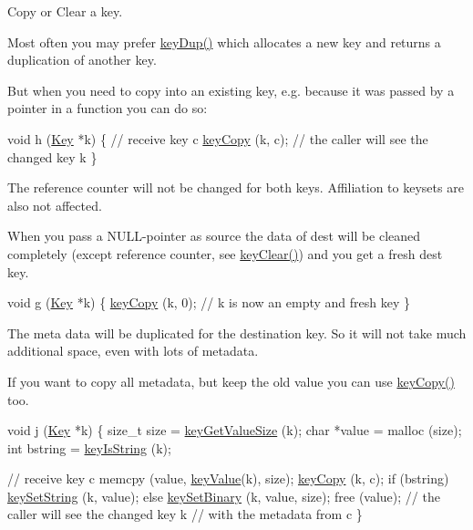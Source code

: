 Copy or Clear a key.

Most often you may prefer \hyperlink{group__key_gae6ec6a60cc4b8c1463fa08623d056ce3}{key\-Dup()} which allocates a new key and returns a duplication of another key.

But when you need to copy into an existing key, e.\-g. because it was passed by a pointer in a function you can do so\-:


\begin{DoxyCode}
\textcolor{keywordtype}{void} h (\hyperlink{classkdb_1_1Key_a5679f5cae63caddd64a60388b9cc77fa}{Key} *k)
\{
        \textcolor{comment}{// receive key c}
        \hyperlink{group__key_ga6a12cbbe656a1ad9f41b8c681d7a2f92}{keyCopy} (k, c);
        \textcolor{comment}{// the caller will see the changed key k}
\}
\end{DoxyCode}


The reference counter will not be changed for both keys. Affiliation to keysets are also not affected.

When you pass a N\-U\-L\-L-\/pointer as source the data of dest will be cleaned completely (except reference counter, see \hyperlink{group__key_gab2242311a36bbc0520e0d36895107ec1}{key\-Clear()}) and you get a fresh dest key.


\begin{DoxyCode}
\textcolor{keywordtype}{void} g (\hyperlink{classkdb_1_1Key_a5679f5cae63caddd64a60388b9cc77fa}{Key} *k)
\{
        \hyperlink{group__key_ga6a12cbbe656a1ad9f41b8c681d7a2f92}{keyCopy} (k, 0);
        \textcolor{comment}{// k is now an empty and fresh key}
\}
\end{DoxyCode}


The meta data will be duplicated for the destination key. So it will not take much additional space, even with lots of metadata.

If you want to copy all metadata, but keep the old value you can use \hyperlink{group__key_ga6a12cbbe656a1ad9f41b8c681d7a2f92}{key\-Copy()} too.


\begin{DoxyCode}
\textcolor{keywordtype}{void} j (\hyperlink{classkdb_1_1Key_a5679f5cae63caddd64a60388b9cc77fa}{Key} *k)
\{
        \textcolor{keywordtype}{size\_t} size = \hyperlink{group__keyvalue_gae326672fffb7474abfe9baf53b73217e}{keyGetValueSize} (k);
        \textcolor{keywordtype}{char} *value = malloc (size);
        \textcolor{keywordtype}{int} bstring = \hyperlink{group__keytest_gaea7670778abd07fee0fe8ac12a149190}{keyIsString} (k);

        \textcolor{comment}{// receive key c}
        memcpy (value, \hyperlink{group__keyvalue_ga6f29609c5da53c6dc26a98678d5752af}{keyValue}(k), size);
        \hyperlink{group__key_ga6a12cbbe656a1ad9f41b8c681d7a2f92}{keyCopy} (k, c);
        \textcolor{keywordflow}{if} (bstring) \hyperlink{group__keyvalue_ga622bde1eb0e0c4994728331326340ef2}{keySetString} (k, value);
        \textcolor{keywordflow}{else} \hyperlink{group__keyvalue_gaa50a5358fd328d373a45f395fa1b99e7}{keySetBinary} (k, value, size);
        free (value);
        \textcolor{comment}{// the caller will see the changed key k}
        \textcolor{comment}{// with the metadata from c}
\}
\end{DoxyCode}


